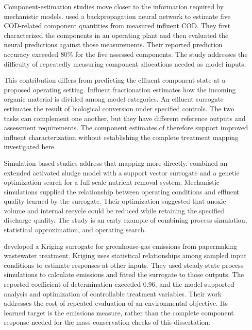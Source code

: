 Component-estimation studies move closer to the information required by mechanistic models. \citet{Wang2024} used a backpropagation neural network to estimate five COD-related component quantities from measured influent COD. They first characterized the components in an operating plant and then evaluated the neural predictions against those measurements. Their reported prediction accuracy exceeded 80\% for the five assessed components. The study addresses the difficulty of repeatedly measuring component allocations needed as model inputs.

This contribution differs from predicting the effluent component state at a proposed operating setting. Influent fractionation estimates how the incoming organic material is divided among model categories. An effluent surrogate estimates the result of biological conversion under specified controls. The two tasks can complement one another, but they have different reference outputs and assessment requirements. The component estimates of \citet{Wang2024} therefore support improved influent characterization without establishing the complete treatment mapping investigated here.

Simulation-based studies address that mapping more directly. \citet{Fang2011} combined an extended activated sludge model with a support vector surrogate and a genetic optimization search for a full-scale nutrient-removal system. Mechanistic simulations supplied the relationship between operating conditions and effluent quality learned by the surrogate. Their optimization suggested that anoxic volume and internal recycle could be reduced while retaining the specified discharge quality. The study is an early example of combining process simulation, statistical approximation, and operating search.

\citet{He2023} developed a Kriging surrogate for greenhouse-gas emissions from papermaking wastewater treatment. Kriging uses statistical relationships among sampled input conditions to estimate responses at other inputs. They used steady-state process simulations to calculate emissions and fitted the surrogate to those outputs. The reported coefficient of determination exceeded 0.96, and the model supported analysis and optimization of controllable treatment variables. Their work addresses the cost of repeated evaluation of an environmental objective. Its learned target is the emissions measure, rather than the complete component response needed for the mass conservation checks of this dissertation.


